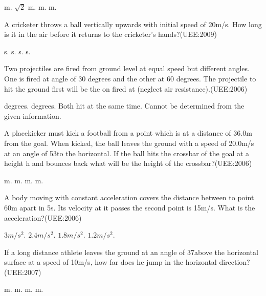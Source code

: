 \documentclass[12pt,addpoints]{exam}
\begin{document}
\begin{questions}
		\begin{oneparchoices}
			 m.
			$\sqrt2$ m.
			 m.
			 m.
		\end{oneparchoices}
	\question A cricketer throws a ball vertically upwards with initial speed of 20m/s. How long is it in the air before it returns to the cricketer's hands?(UEE:2009)\\
	\begin{oneparchoices}
		\choice 2 s.
		\choice 10 s.
		\choice 1.5 s.
		\choice 4 s.
	\end{oneparchoices}
	\question Two projectiles are fired from ground level at equal speed but different angles. One is fired at angle of 30 degrees and the other at 60 degrees. The projectile to hit the ground first will be the on fired at (neglect air resistance).(UEE:2006) \\
	\begin{oneparchoices}
		 degrees.
		 degrees.
		\choice Both hit at the same time.
		\choice Cannot be determined from the given information.
	\end{oneparchoices}
	\question A placekicker must kick a football from a point which is at a distance of 36.0m from the goal. When kicked, the ball leaves the ground with a speed of 20.0m/s at an angle of 53\textdegree to the horizontal. If the ball hits the crossbar of the goal at a height h and bounces back what will be the height of the crossbar?(UEE:2006)\\
	\begin{oneparchoices}
		.45 m.
		\choice 2.85 m.
		\choice 3.00 m.
		\choice 3.15 m.
	\end{oneparchoices}
	\question A body moving with constant acceleration covers the distance between to point 60m apart in 5s. Its velocity at it passes the second point is 15m/s. What is the acceleration?(UEE:2006)\\
	\begin{oneparchoices}
		\choice $3m/s^2.$
		\choice $2.4m/s^2.$
		\choice $1.8m/s^2.$
		\choice $1.2m/s^2.$
	\end{oneparchoices}
	\question If a long distance athlete leaves the ground at an angle of 37\textdegree above the horizontal surface at a speed of 10m/s, how far does he jump in the horizontal direction?(UEE:2007)\\
	\begin{oneparchoices}
		.8 m.
		\choice 6 m.
		\choice 9.6 m.
		\choice 12 m.
	\end{oneparchoices}

\end{questions}
\end{document}

